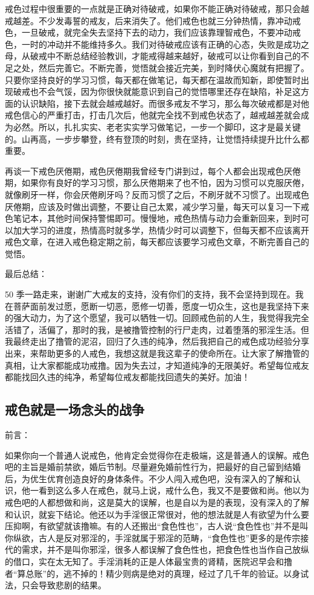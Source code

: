 戒色过程中很重要的一点就是正确对待破戒，如果你不能正确对待破戒，那只会越戒越差。不少发毒誓的戒友，后来消失了。他们戒色也就三分钟热情，靠冲动戒色，一旦破戒，就完全失去坚持下去的动力，我们应该靠理智戒色，不要冲动戒色，一时的冲动并不能维持多久。我们对待破戒应该有正确的心态，失败是成功之母，从破戒中不断总结经验教训，才能戒得越来越好，破戒可以让你看到自己的不足之处，然后完善它。不断完善，觉悟就会接近完美，到时降伏心魔就有把握了。只要你坚持良好的学习习惯，每天都在做笔记，每天都在温故而知新，即使暂时出现破戒也不会气馁，因为你很快就能意识到自己的觉悟哪里还存在缺陷，补足这方面的认识缺陷，接下去就会越戒越好。而很多戒友不学习，那么每次破戒都是对他戒色信心的严重打击，打击几次后，他就完全找不到戒色状态了，越戒越差就会成为必然。所以，扎扎实实、老老实实学习做笔记，一步一个脚印，这才是最关键的。山再高，一步步攀登，终有登顶的时刻，贵在坚持，让觉悟持续提升比什么都重要。

再谈一下戒色厌倦期，戒色厌倦期我曾经专门讲到过，每个人都会出现戒色厌倦期，如果你有良好的学习习惯，那么厌倦期来了也不怕，因为习惯可以克服厌倦，就像刷牙一样，你会厌倦刷牙吗？反而习惯了之后，不刷牙就不习惯了。出现戒色厌倦期，应该及时做出调整，不要让自己太累，减少学习量，每天可以复习一下戒色笔记本，其他时间保持警惕即可。慢慢地，戒色热情与动力会重新回来，到时可以加大学习的进度，热情高时就多学，热情少时可以调整下，但每天都不应该离开戒色文章，在进入戒色稳定期之前，每天都应该要学习戒色文章，不断完善自己的觉悟。

最后总结：

50 季一路走来，谢谢广大戒友的支持，没有你们的支持，我不会坚持到现在。我在菩萨面前发过愿，愿断一切恶，愿修一切善，愿度一切众生，这也是我坚持下来的强大动力，为了这个愿望，我可以牺牲一切。回顾戒色前的人生，我觉得我完全活错了，活偏了，那时的我，是被撸管控制的行尸走肉，过着堕落的邪淫生活。但我最终走出了撸管的泥沼，回归了久违的纯净，然后我把自己的戒色成功经验分享出来，来帮助更多的人戒色，我想这就是我这辈子的使命所在。让大家了解撸管的真相，让大家都能成功戒撸。因为失去过，才知道纯净的无限美好。希望每位戒友都能找回久违的纯净，希望每位戒友都能找回遗失的美好。加油！

\subsection{戒色就是一场念头的战争}

前言：

如果你向一个普通人说戒色，他肯定会觉得你在走极端，这是普通人的误解。戒色吧的主旨是婚前禁欲，婚后节制。尽量避免婚前性行为，把最好的自己留到结婚后，为优生优育创造良好的身体条件。不少人闯入戒色吧，没有深入的了解和认识，他一看到这么多人在戒色，就马上说，戒什么色，我又不是要做和尚。他以为戒色吧的人都想做和尚，这是莫大的误解，也是自以为是的表现，没有深入的了解和认识，就妄下结论。他还以为手淫很正常很对，他的想法就是人有欲望为什么要压抑啊，有欲望就该撸嘛。有的人还搬出“食色性也”，古人说“食色性也”并不是叫你纵欲，古人是反对邪淫的，手淫就属于邪淫的范畴，“食色性也”更多的是传宗接代的需求，并不是叫你邪淫，很多人都误解了食色性也，把食色性也当作自己放纵的借口，实在太无知了。手淫消耗的正是人体最宝贵的肾精，医院迟早会和撸者“算总账”的，逃不掉的！精少则病是绝对的真理，经过了几千年的验证。以身试法，只会导致悲剧的结果。

